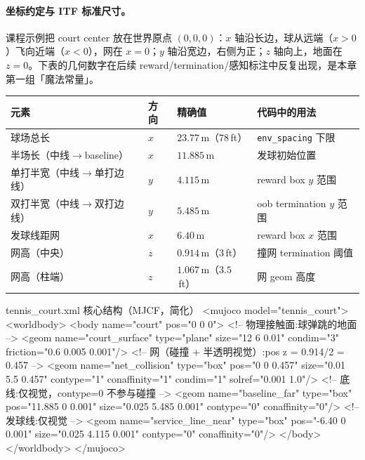 \paragraph{坐标约定与 ITF 标准尺寸。}课程示例把 court center 放在世界原点 $(0,0,0)$：$x$ 轴沿长边，球从远端（$x>0$）飞向近端（$x<0$），网在 $x=0$；$y$ 轴沿宽边，右侧为正；$z$ 轴向上，地面在 $z=0$。下表的几何数字在后续 reward/termination/感知标注中反复出现，是本章第一组「魔法常量」。

\begin{center}
\small
\begin{tabular}{@{}llll@{}}
\toprule
元素 & 方向 & 精确值 & 代码中的用法 \\
\midrule
球场总长 & $x$ & $23.77$\,m（$78$\,ft） & \verb|env_spacing| 下限 \\
半场长（中线$\to$baseline） & $x$ & $11.885$\,m & 发球初始位置 \\
单打半宽（中线$\to$单打边线） & $y$ & $4.115$\,m & reward box $y$ 范围 \\
双打半宽（中线$\to$双打边线） & $y$ & $5.485$\,m & oob termination $y$ 范围 \\
发球线距网 & $x$ & $6.40$\,m & reward box $x$ 范围 \\
网高（中央） & $z$ & $0.914$\,m（$3$\,ft） & 撞网 termination 阈值 \\
网高（柱端） & $z$ & $1.067$\,m（$3.5$\,ft） & 网 geom 高度 \\
\bottomrule
\end{tabular}
\end{center}

\begin{codebox}[text]{tennis\_court.xml 核心结构（MJCF，简化）}
<mujoco model="tennis_court">
  <worldbody>
    <body name="court" pos="0 0 0">
      <!-- 物理接触面:球弹跳的地面 -->
      <geom name="court_surface" type="plane" size="12 6 0.01"
            condim="3" friction="0.6 0.005 0.001"/>
      <!-- 网（碰撞 + 半透明视觉）:pos z = 0.914/2 = 0.457 -->
      <geom name="net_collision" type="box" pos="0 0 0.457"
            size="0.01 5.5 0.457" contype="1" conaffinity="1"
            condim="1" solref="0.001 1.0"/>
      <!-- 底线:仅视觉，contype=0 不参与碰撞 -->
      <geom name="baseline_far" type="box" pos="11.885 0 0.001"
            size="0.025 5.485 0.001" contype="0" conaffinity="0"/>
      <!-- 发球线:仅视觉 -->
      <geom name="service_line_near" type="box" pos="-6.40 0 0.001"
            size="0.025 4.115 0.001" contype="0" conaffinity="0"/>
    </body>
  </worldbody>
</mujoco>
\end{codebox}

